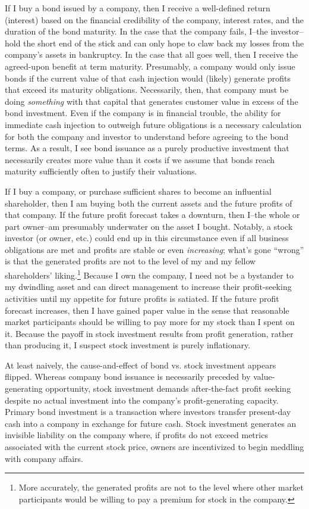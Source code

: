 If I buy a bond issued by a company, then I receive a well-defined return (interest) based on the financial credibility of the company, interest rates, and the duration of the bond maturity.  In the case that the company fails, I--the investor--hold the short end of the stick and can only hope to claw back my losses from the company's assets in bankruptcy.  In the case that all goes well, then I receive the agreed-upon benefit at term maturity.  Presumably, a company would only issue bonds if the current value of that cash injection would (likely) generate profits that exceed its maturity obligations.  Necessarily, then, that company must be doing {\it something} with that capital that generates customer value in excess of the bond investment.  Even if the company is in financial trouble, the ability for immediate cash injection to outweigh future obligations is a necessary calculation for both the company and investor to understand before agreeing to the bond terms.  As a result, I see bond issuance as a purely productive investment that necessarily creates more value than it costs if we assume that bonds reach maturity sufficiently often to justify their valuations.  

If I buy a company, or purchase sufficient shares to become an influential shareholder, then I am buying both the current assets and the future profits of that company.  If the future profit forecast takes a downturn, then I--the whole or part owner--am presumably underwater on the asset I bought.  Notably, a stock investor (or owner, etc.) could end up in this circumstance even if all business obligations are met and profits are stable or even {\it increasing}; what's gone ``wrong'' is that the generated profits are not to the level of my and my fellow shareholders' liking.\footnote{More accurately, the generated profits are not to the level where other market participants would be willing to pay a premium for stock in the company.}  Because I own the company, I need not be a bystander to my dwindling asset and can direct management to increase their profit-seeking activities until my appetite for future profits is satiated.  If the future profit forecast increases, then I have gained paper value in the sense that reasonable market participants should be willing to pay more for my stock than I spent on it.  Because the payoff in stock investment results from profit generation, rather than producing it, I suspect stock investment is purely inflationary.

At least naively, the cause-and-effect of bond vs. stock investment appears flipped.  
Whereas company bond issuance is necessarily preceded by value-generating opportunity, stock investment demands after-the-fact profit seeking despite no actual investment into the company's profit-generating capacity.  Primary bond investment is a transaction where investors transfer present-day cash into a company in exchange for future cash.  Stock investment generates an invisible liability on the company where, if profits do not exceed metrics associated with the current stock price, owners are incentivized to begin meddling with company affairs.


